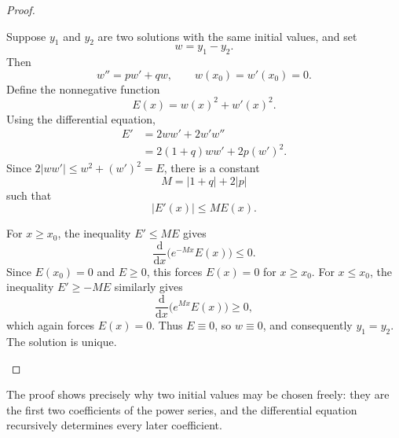 \begin{proof}
    \begin{subproof}[Uniqueness]
        Suppose \(y_1\) and \(y_2\) are two solutions with the same initial
        values, and set
        \[
            w=y_1-y_2.
        \]
        Then
        \[
            w''=pw'+qw,
            \qquad
            w(x_0)=w'(x_0)=0.
        \]
        Define the nonnegative function
        \[
            E(x)=w(x)^2+w'(x)^2.
        \]
        Using the differential equation,
        \begin{align*}
            E'
            &=2ww'+2w'w''\\
            &=2(1+q)ww'+2p(w')^2.
        \end{align*}
        Since \(2|ww'|\leq w^2+(w')^2=E\), there is a constant
        \[
            M=|1+q|+2|p|
        \]
        such that
        \[
            |E'(x)|\leq M E(x).
        \]

        For \(x\geq x_0\), the inequality \(E'\leq ME\) gives
        \[
            \frac{\mathrm{d}}{\mathrm{d}x}
            \bigl(e^{-Mx}E(x)\bigr)\leq0.
        \]
        Since \(E(x_0)=0\) and \(E\geq0\), this forces \(E(x)=0\) for
        \(x\geq x_0\).  For \(x\leq x_0\), the inequality
        \(E'\geq-ME\) similarly gives
        \[
            \frac{\mathrm{d}}{\mathrm{d}x}
            \bigl(e^{Mx}E(x)\bigr)\geq0,
        \]
        which again forces \(E(x)=0\).  Thus \(E\equiv0\), so
        \(w\equiv0\), and consequently \(y_1=y_2\).  The solution is
        unique.
    \end{subproof}
\end{proof}

The proof shows precisely why two initial values may be chosen freely:
they are the first two coefficients of the power series, and the
differential equation recursively determines every later coefficient.

